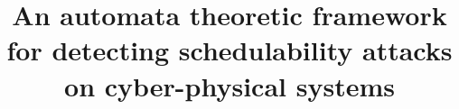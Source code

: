 \documentclass[runningheads,a4paper]{IEEEtran}
\title{ An automata theoretic framework for detecting schedulability attacks on cyber-physical systems}
\begin{document}
\maketitle




%

%
%

%

%



{\small
\nocite{*}

}
%
%
\end{document}
